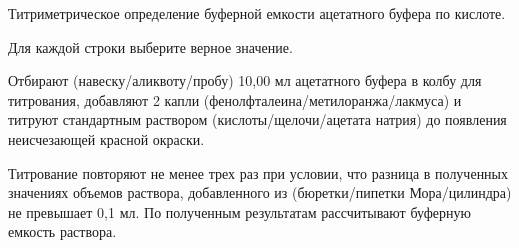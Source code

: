 
Титриметрическое
определение буферной емкости ацетатного буфера по кислоте.

Для каждой строки выберите верное значение.

Отбирают (навеску/аликвоту/пробу) 10,00 мл ацетатного буфера в колбу для титрования, добавляют 2 капли 
(фенолфталеина/метилоранжа/лакмуса) и титруют стандартным раствором (кислоты/щелочи/ацетата натрия) до появления неисчезающей красной окраски. 

Титрование повторяют не менее трех раз при условии, что разница в полученных значениях объемов раствора, добавленного из (бюретки/пипетки Мора/цилиндра) не превышает 0,1 мл. По полученным результатам рассчитывают буферную емкость раствора.

